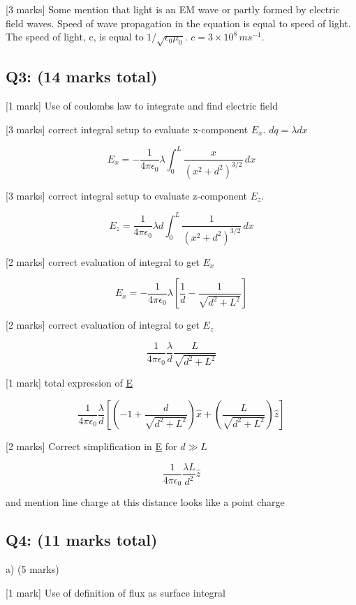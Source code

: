 \documentclass[a4paper,11pt]{article}
\begin{document}
[3 marks] Some mention that light is an EM wave or partly formed by electric field waves. Speed of wave propagation in the equation is equal to speed of light. The speed of light, c,  is equal to \(1/\sqrt{\epsilon_{0}\mu_{0}}\). \(c = 3 \times 10^8 \, ms^{-1}\).

\subsection*{Q3: (14 marks total)}

[1 mark] Use of coulombs law to integrate and find electric field

[3 marks] correct integral setup to evaluate x-component \( E_x \). \( dq = \lambda dx \)

\[ E_x = - \frac{1}{4\pi \epsilon_0} \lambda \int_{0}^{L} \frac{x}{(x^2+d^2)^{3/2}} \, dx \]

[3 marks] correct integral setup to evaluate z-component \( E_z \).

\[ E_z = \frac{1}{4\pi \epsilon_0} \lambda d  \int_{0}^{L} \frac{1}{(x^2+d^2)^{3/2}} \, dx \]

[2 marks] correct evaluation of integral to get \( E_x \)

\[ E_x = -\frac{1}{4 \pi \epsilon_0} \lambda \left [ \frac{1}{d} - \frac{1}{\sqrt{d^2+L^2}} \right ] \]

[2 marks] correct evaluation of integral to get \( E_z \)

\[ \frac{1}{4 \pi \epsilon_0} \frac{\lambda}{d} \frac{L}{\sqrt{d^2+L^2}} \]

[1 mark] total expression of \underline{E}

\[
\frac{1}{4 \pi \epsilon_0} \frac{\lambda}{d} \left [ \left ( -1+\frac{d}{\sqrt{d^2+L^2}} \right ) \hat{x} +\left ( \frac{L}{\sqrt{d^2+L^2}} \right ) \hat{z} \right ]
\]

[2 marks] Correct simplification in \underline{E} for \( d \gg L \)

\[ \frac{1}{4 \pi \epsilon_0} \frac{\lambda L}{d^2} \hat{z} \]

and mention line charge at this distance looks like a point charge

\subsection*{Q4: (11 marks total)}

a) (5 marks)

[1 mark] Use of definition of flux as surface integral
\end{document}

